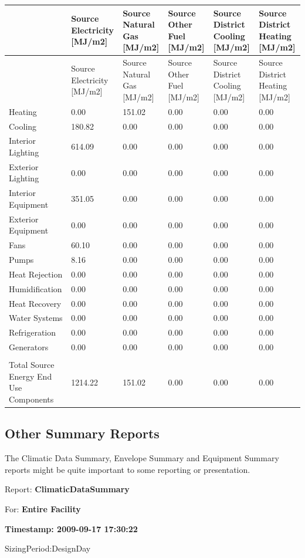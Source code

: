 {\scriptsize
\begin{longtable}[c]{>{\raggedright}p{1.0in}>{\raggedright}p{1.0in}>{\raggedright}p{1.0in}>{\raggedright}p{1.0in}>{\raggedright}p{1.0in}>{\raggedright}p{1.0in}}
\toprule
 & Source Electricity [MJ/m2] & Source Natural Gas [MJ/m2] & Source Other Fuel [MJ/m2] & Source District Cooling [MJ/m2] & Source District Heating [MJ/m2] \tabularnewline
\midrule
\endfirsthead

\toprule
 & Source Electricity [MJ/m2] & Source Natural Gas [MJ/m2] & Source Other Fuel [MJ/m2] & Source District Cooling [MJ/m2] & Source District Heating [MJ/m2] \tabularnewline
\midrule
\endhead

Heating & 0.00 & 151.02 & 0.00 & 0.00 & 0.00 \tabularnewline
Cooling & 180.82 & 0.00 & 0.00 & 0.00 & 0.00 \tabularnewline
Interior Lighting & 614.09 & 0.00 & 0.00 & 0.00 & 0.00 \tabularnewline
Exterior Lighting & 0.00 & 0.00 & 0.00 & 0.00 & 0.00 \tabularnewline
Interior Equipment & 351.05 & 0.00 & 0.00 & 0.00 & 0.00 \tabularnewline
Exterior Equipment & 0.00 & 0.00 & 0.00 & 0.00 & 0.00 \tabularnewline
Fans & 60.10 & 0.00 & 0.00 & 0.00 & 0.00 \tabularnewline
Pumps & 8.16 & 0.00 & 0.00 & 0.00 & 0.00 \tabularnewline
Heat Rejection & 0.00 & 0.00 & 0.00 & 0.00 & 0.00 \tabularnewline
Humidification & 0.00 & 0.00 & 0.00 & 0.00 & 0.00 \tabularnewline
Heat Recovery & 0.00 & 0.00 & 0.00 & 0.00 & 0.00 \tabularnewline
Water Systems & 0.00 & 0.00 & 0.00 & 0.00 & 0.00 \tabularnewline
Refrigeration & 0.00 & 0.00 & 0.00 & 0.00 & 0.00 \tabularnewline
Generators & 0.00 & 0.00 & 0.00 & 0.00 & 0.00 \tabularnewline
 &  &  &  &  &  \tabularnewline
Total Source Energy End Use Components & 1214.22 & 151.02 & 0.00 & 0.00 & 0.00 \tabularnewline
\bottomrule
\end{longtable}}

\subsection{Other Summary Reports}\label{other-summary-reports}

The Climatic Data Summary, Envelope Summary and Equipment Summary reports might be quite important to some reporting or presentation.

Report: \textbf{ClimaticDataSummary}

For: \textbf{Entire Facility}

\textbf{Timestamp: 2009-09-17 17:30:22}

SizingPeriod:DesignDay

